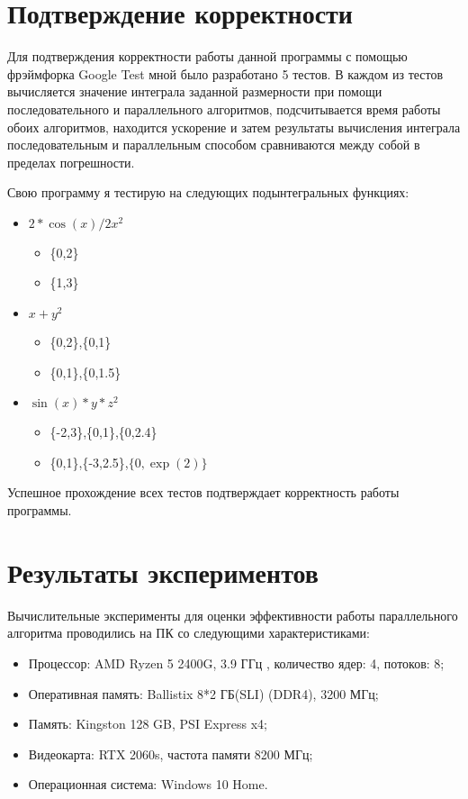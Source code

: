 \documentclass{report}
\begin{document}
\section*{Подтверждение корректности}
Для подтверждения корректности работы данной программы с помощью фрэймфорка Google Test мной было разработано 5 тестов. В каждом из тестов вычисляется значение интеграла заданной размерности при помощи последовательного и параллельного алгоритмов, подсчитывается время работы обоих алгоритмов, находится ускорение и затем результаты вычисления интеграла последовательным и параллельным способом сравниваются между собой в пределах погрешности.
\par Свою программу я тестирую на следующих подынтегральных функциях:
\begin{itemize}
  \item $2*\cos(x)/ 2x^2$
	\begin{itemize}
		\item  \{0,2\}
		\item \{1,3\}
	\end{itemize}
  \item $x+y^2$
	\begin{itemize}
		\item  \{0,2\},\{0,1\}
		\item \{0,1\},\{0,1.5\}
	\end{itemize}
  \item $\sin(x)*y*z^2$
	\begin{itemize}
		\item  \{-2,3\},\{0,1\},\{0,2.4\}
		\item \{0,1\},\{-3,2.5\},$\{0,\exp(2)\}$
	\end{itemize}
\end{itemize}
\par Успешное прохождение всех тестов подтверждает корректность работы программы.
\newpage

\section*{Результаты экспериментов}
Вычислительные эксперименты для оценки эффективности работы параллельного алгоритма проводились на ПК со следующими характеристиками:
\begin{itemize}
\item Процессор: AMD Ryzen 5 2400G, 3.9 ГГц , количество ядер: 4, потоков: 8;
\item Оперативная память: Ballistix 8*2 ГБ(SLI) (DDR4), 3200 МГц;
\item Память: Kingston 128 GB, PSI Express x4;
\item Видеокарта: RTX 2060s, частота памяти 8200 МГц;
\item Операционная система: Windows 10 Home.
\end{itemize}
\end{document}
